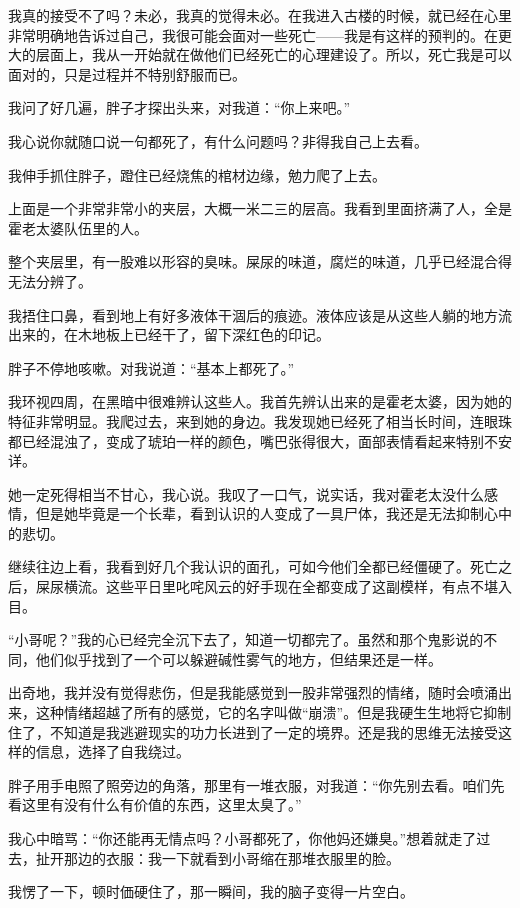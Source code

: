我真的接受不了吗？未必，我真的觉得未必。在我进入古楼的时候，就已经在心里非常明确地告诉过自己，我很可能会面对一些死亡——我是有这样的预判的。在更大的层面上，我从一开始就在做他们已经死亡的心理建设了。所以，死亡我是可以面对的，只是过程并不特别舒服而已。

我问了好几遍，胖子才探出头来，对我道：“你上来吧。”

我心说你就随口说一句都死了，有什么问题吗？非得我自己上去看。

我伸手抓住胖子，蹬住已经烧焦的棺材边缘，勉力爬了上去。

上面是一个非常非常小的夹层，大概一米二三的层高。我看到里面挤满了人，全是霍老太婆队伍里的人。

整个夹层里，有一股难以形容的臭味。屎尿的味道，腐烂的味道，几乎已经混合得无法分辨了。

我捂住口鼻，看到地上有好多液体干涸后的痕迹。液体应该是从这些人躺的地方流出来的，在木地板上已经干了，留下深红色的印记。

胖子不停地咳嗽。对我说道：“基本上都死了。”

我环视四周，在黑暗中很难辨认这些人。我首先辨认出来的是霍老太婆，因为她的特征非常明显。我爬过去，来到她的身边。我发现她已经死了相当长时间，连眼珠都已经混浊了，变成了琥珀一样的颜色，嘴巴张得很大，面部表情看起来特别不安详。

她一定死得相当不甘心，我心说。我叹了一口气，说实话，我对霍老太没什么感情，但是她毕竟是一个长辈，看到认识的人变成了一具尸体，我还是无法抑制心中的悲切。

继续往边上看，我看到好几个我认识的面孔，可如今他们全都已经僵硬了。死亡之后，屎尿横流。这些平日里叱咤风云的好手现在全都变成了这副模样，有点不堪入目。

“小哥呢？”我的心已经完全沉下去了，知道一切都完了。虽然和那个鬼影说的不同，他们似乎找到了一个可以躲避碱性雾气的地方，但结果还是一样。

出奇地，我并没有觉得悲伤，但是我能感觉到一股非常强烈的情绪，随时会喷涌出来，这种情绪超越了所有的感觉，它的名字叫做“崩溃”。但是我硬生生地将它抑制住了，不知道是我逃避现实的功力长进到了一定的境界。还是我的思维无法接受这样的信息，选择了自我绕过。

胖子用手电照了照旁边的角落，那里有一堆衣服，对我道：“你先别去看。咱们先看这里有没有什么有价值的东西，这里太臭了。”

我心中暗骂：“你还能再无情点吗？小哥都死了，你他妈还嫌臭。”想着就走了过去，扯开那边的衣服：我一下就看到小哥缩在那堆衣服里的脸。

我愣了一下，顿时価硬住了，那一瞬间，我的脑子变得一片空白。

